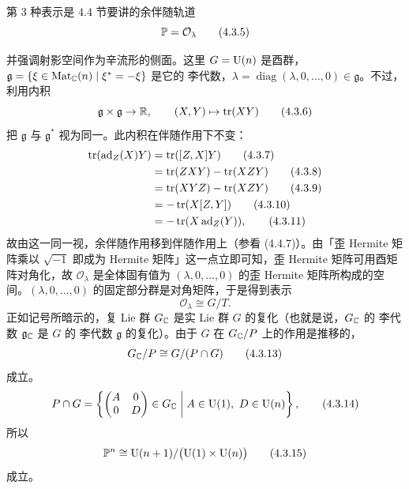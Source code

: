 第 3 种表示是 4.4 节要讲的余伴随轨道
\begin{equation}
  \mathbb{P} = \mathcal{O}_\lambda
  \tag{4.3.5}
\end{equation}


并强调射影空间作为辛流形的侧面。这里 $G = \operatorname{U}(n)$ 是酉群，$\mathfrak{g} = \{\xi\in\operatorname{Mat}_{\mathbb{C}}(n)\mid\xi^* = -\xi\}$ 是它的 李代数，$\lambda = \operatorname{diag}(\lambda,0,\dots,0)\in\mathfrak{g}$。不过，利用内积
\begin{equation}
  \mathfrak{g}\times\mathfrak{g}\to\mathbb{R},\qquad (X,Y)\mapsto\operatorname{tr}(XY)
  \tag{4.3.6}
\end{equation}
把 $\mathfrak{g}$ 与 $\mathfrak{g}^*$ 视为同一。此内积在伴随作用下不变：
\begin{align}
  \operatorname{tr}(\operatorname{ad}_Z(X)Y) &= \operatorname{tr}([Z,X]Y)
  \tag{4.3.7}\\
  &= \operatorname{tr}(ZXY)-\operatorname{tr}(XZY)
  \tag{4.3.8}\\
  &= \operatorname{tr}(XYZ)-\operatorname{tr}(XZY)
  \tag{4.3.9}\\
  &= -\operatorname{tr}(X[Z,Y])
  \tag{4.3.10}\\
  &= -\operatorname{tr}(X\operatorname{ad}_Z(Y)),
  \tag{4.3.11}
\end{align}
故由这一同一视，余伴随作用移到伴随作用上（参看 (4.4.7)）。由「歪 Hermite 矩阵乘以 $\sqrt{-1}$ 即成为 Hermite 矩阵」这一点立即可知，歪 Hermite 矩阵可用酉矩阵对角化，故 $\mathcal{O}_\lambda$ 是全体固有值为 $(\lambda,0,\dots,0)$ 的歪 Hermite 矩阵所构成的空间。$(\lambda,0,\dots,0)$ 的固定部分群是对角矩阵，于是得到表示
\begin{equation}
  \mathcal{O}_\lambda\cong G/T.
  \tag{4.3.12}
\end{equation}
正如记号所暗示的，复 Lie 群 $G_{\mathbb{C}}$ 是实 Lie 群 $G$ 的复化（也就是说，$G_{\mathbb{C}}$ 的 李代数 $\mathfrak{g}_{\mathbb{C}}$ 是 $G$ 的 李代数 $\mathfrak{g}$ 的复化）。由于 $G$ 在 $G_{\mathbb{C}}/P$ 上的作用是推移的，
\begin{equation}
  G_{\mathbb{C}}/P\cong G/(P\cap G)
  \tag{4.3.13}
\end{equation}
成立。
\begin{equation}
  P\cap G = \left\{\begin{pmatrix}A & 0\\ 0 & D\end{pmatrix}\in G_{\mathbb{C}}\;\middle|\;
  A\in\operatorname{U}(1),\ D\in\operatorname{U}(n)\right\},
  \tag{4.3.14}
\end{equation}
所以
\begin{equation}
  \mathbb{P}^n\cong\operatorname{U}(n+1)/\bigl(\operatorname{U}(1)\times\operatorname{U}(n)\bigr)
  \tag{4.3.15}
\end{equation}
成立。

